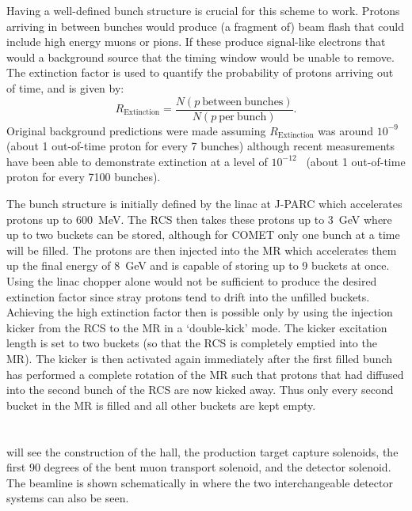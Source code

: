 Having a well-defined bunch structure is crucial for this scheme to work. 
Protons arriving in between bunches would produce (a fragment of) beam flash that could include high energy muons or pions.   
If these produce signal-like electrons that would a background source that the timing window would be unable to remove.
The extinction factor is used to quantify the probability of protons arriving out of time, and is given by:
\begin{equation}
	R_\mathrm{Extinction}=\frac{N(p~\mathrm{between~bunches})}{N(p~\mathrm{per~bunch})}.
\end{equation}
Original background predictions were made assuming $R_\mathrm{Extinction}$ was around $10^{-9}$~\cite{CDRphase2} (about 1 out-of-time proton for every 7 \phaseI bunches) although recent measurements have been able to demonstrate extinction at a level of $10^{-12}$~\cite{COMETExtinctionNote} (about 1 out-of-time proton for every 7100 \phaseI bunches).

The bunch structure is initially defined by the linac at J-PARC which accelerates protons up to 600~MeV.
The \ac{RCS} then takes these protons up to 3~GeV where up to two buckets can be stored, although for COMET only one bunch at a time will be filled.
The protons are then injected into the \ac{MR} which accelerates them up the final energy of 8~GeV and is capable of storing up to 9 buckets at once.
Using the linac chopper alone would not be sufficient to produce the desired extinction factor since stray protons tend to drift into the unfilled buckets.
Achieving the high extinction factor then is possible only by using the injection kicker from the \ac{RCS} to the \ac{MR} in a `double-kick' mode.
The kicker excitation length is set to two buckets (so that the \ac{RCS} is completely emptied into the \ac{MR}).  
The kicker is then activated again immediately after the first filled bunch has performed a complete rotation of the \ac{MR} such that protons that had diffused into the second bunch of the \ac{RCS} are now kicked away.
Thus only every second bucket in the \ac{MR} is filled and all other buckets are kept empty.

\section{\COMET \phaseI}
\FigPhaseI
\phaseI will see the construction of the \COMET hall, the production target capture solenoids, the first 90 degrees of the bent muon transport solenoid, and the detector solenoid.  
The beamline is shown schematically in  where the two interchangeable detector systems can also be seen.

